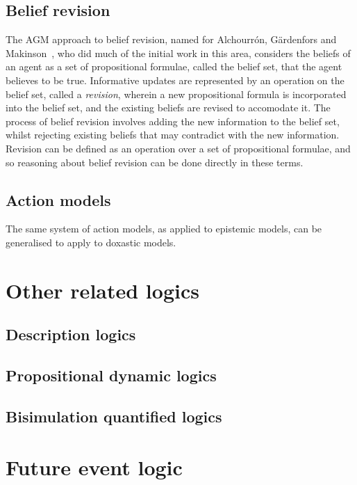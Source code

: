 \subsection*{Belief revision}

The AGM approach to belief revision, named for Alchourrón, Gärdenfors and
Makinson~\cite{alchourron1985logic}, who did much of the initial work in this
area, considers the beliefs of an agent as a set of propositional formulae,
called the belief set, that the agent believes to be true. Informative updates
are represented by an operation on the belief set, called a {\em revision},
wherein a new propositional formula is incorporated into the belief set, and the
existing beliefs are revised to accomodate it. The process of belief revision
involves adding the new information to the belief set, whilst rejecting existing
beliefs that may contradict with the new information. Revision can be
defined as an operation over a set of propositional formulae, and so reasoning
about belief revision can be done directly in these terms. %

\subsection*{Action models}

The same system of action models, as applied to epistemic models, can be
generalised to apply to doxastic models.

\section{Other related logics}

\subsection*{Description logics}

\subsection*{Propositional dynamic logics}

\subsection*{Bisimulation quantified logics}

\section{Future event logic}

